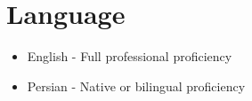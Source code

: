 \section*{Language}
\begin{itemize}
    \item English - Full professional proficiency
    \item Persian - Native or bilingual proficiency
\end{itemize}